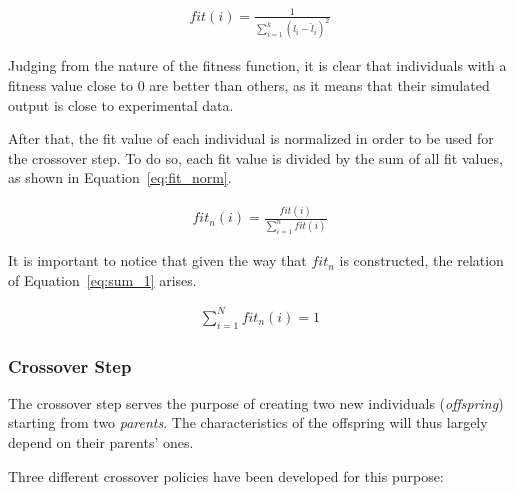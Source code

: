 \begin{align}
fit(i) = \frac{1}{\sum_{i=1}^k{\left(l_i-\hat{l}_i\right)^2}}
\label{eq:fitness}
\end{align}

Judging from the nature of the fitness function, it is clear that
individuals with a fitness value close to 0 are better than others,
as it means that their simulated output is close to experimental data.

After that, the fit value of each individual is normalized in order to be used
for the crossover step. To do so, each fit value is divided by the sum of all fit values,
as shown in Equation~\ref{eq:fit_norm}.

\begin{align}
fit_n(i) = \frac{fit(i)}{\sum_{i=1}^n fit(i)}
\label{eq:fit_norm}
\end{align}

It is important to notice that given the way that $fit_n$ is constructed,
the relation of Equation~\ref{eq:sum_1} arises.

\begin{align}
\sum_{i=1}^N fit_n(i) = 1
\label{eq:sum_1}
\end{align}

\subsubsection{Crossover Step}


The crossover step serves the purpose of creating two new individuals (\textit{offspring})
starting from two \textit{parents}. The characteristics of the offspring will thus
largely depend on their parents' ones.

Three different crossover policies have been developed for this purpose:



